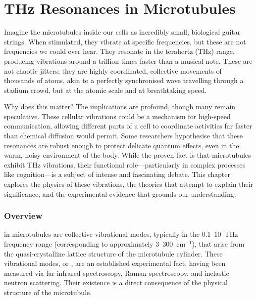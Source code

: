 
\chapter{THz Resonances in Microtubules}
\label{ch:thz-resonances-microtubules}

\begin{nontechnical}
    Imagine the microtubules inside our cells as incredibly small, biological guitar strings. When stimulated, they vibrate at specific frequencies, but these are not frequencies we could ever hear. They resonate in the terahertz (THz) range, producing vibrations around a trillion times faster than a musical note. These are not chaotic jitters; they are highly coordinated, collective movements of thousands of atoms, akin to a perfectly synchronised wave travelling through a stadium crowd, but at the atomic scale and at breathtaking speed.

    Why does this matter? The implications are profound, though many remain speculative. These cellular vibrations could be a mechanism for high-speed communication, allowing different parts of a cell to coordinate activities far faster than chemical diffusion would permit. Some researchers hypothesise that these resonances are robust enough to protect delicate quantum effects, even in the warm, noisy environment of the body. While the proven fact is that microtubules exhibit THz vibrations, their functional role---particularly in complex processes like cognition---is a subject of intense and fascinating debate. This chapter explores the physics of these vibrations, the theories that attempt to explain their significance, and the experimental evidence that grounds our understanding.
\end{nontechnical}

\subsection{Overview}

 in microtubules are collective vibrational modes, typically in the 0.1--10~THz frequency range (corresponding to approximately 3--300~cm\(^{-1}\)), that arise from the quasi-crystalline lattice structure of the microtubule cylinder. These vibrational modes, or , are an established experimental fact, having been measured via far-infrared spectroscopy, Raman spectroscopy, and inelastic neutron scattering. Their existence is a direct consequence of the physical structure of the microtubule.

